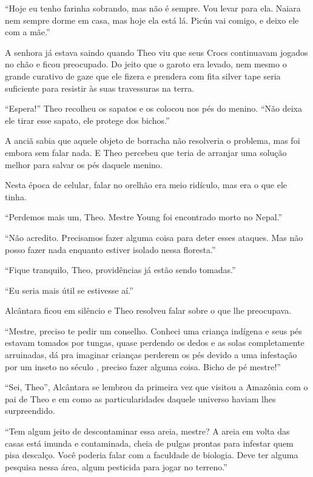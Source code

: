 ``Hoje eu tenho farinha sobrando, mas não é sempre. Vou levar para ela.
Naiara nem sempre dorme em casa, mas hoje ela está lá. Picún vai comigo,
e deixo ele com a mãe.''

A senhora já estava saindo quando Theo viu que seus Crocs continuavam
jogados no chão e ficou preocupado. Do jeito que o garoto era levado,
nem mesmo o grande curativo de gaze que ele fizera e prendera com fita
silver tape seria suficiente para resistir às suas travessuras na terra.

``Espera!'' Theo recolheu os sapatos e os colocou nos pés do menino.
``Não deixa ele tirar esse sapato, ele protege dos bichos.''

A anciã sabia que aquele objeto de borracha não resolveria o problema,
mas foi embora sem falar nada. E Theo percebeu que teria de arranjar uma
solução melhor para salvar os pés daquele menino.

\asterisc


Nesta época de celular, falar no orelhão era meio ridículo, mas era o
que ele tinha.

``Perdemos mais um, Theo. Mestre Young foi encontrado morto no Nepal.''

``Não acredito. Precisamos fazer alguma coisa para deter esses ataques.
Mas não posso fazer nada enquanto estiver isolado nessa floresta.''

``Fique tranquilo, Theo, providências já estão sendo tomadas.''

``Eu seria mais útil se estivesse aí.''

Alcântara ficou em silêncio e Theo resolveu falar sobre o que lhe
preocupava.

``Mestre, preciso te pedir um conselho. Conheci uma criança indígena e
seus pés estavam tomados por tungas, quase perdendo os dedos e as solas
completamente arruinadas, dá pra imaginar crianças perderem os pés
devido a uma infestação por um inseto no século , preciso fazer
alguma coisa. Bicho de pé mestre!''

``Sei, Theo'', Alcântara se lembrou da primeira vez que visitou a
Amazônia com o pai de Theo e em como as particularidades daquele
universo haviam lhes surpreendido.

``Tem algum jeito de descontaminar essa areia, mestre? A areia em volta
das casas está imunda e contaminada, cheia de pulgas prontas para
infestar quem pisa descalço. Você poderia falar com a faculdade de
biologia. Deve ter alguma pesquisa nessa área, algum pesticida para
jogar no terreno.''

